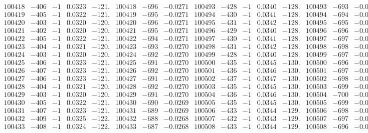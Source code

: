 \documentclass[11pt,reqno,a4letter]{article}
\numberwithin{figure}{section}
\numberwithin{table}{section}
\theoremstyle{plain}
\numberwithin{theorem}{section}
\theoremstyle{definition}
\begin{document}
\begin{table}[ht!]
\begin{equation*}
{\begin{array}{ccccc|ccc||ccccc|ccc}
100418 & -406 & -1 & 0.0323 & -121. & 100418 & -696 & -0.0271 & 100493 & -428 & -1 & 0.0340 & -128. & 100493 & -693 & -0.0270  \\
100419 & -405 & -1 & 0.0322 & -121. & 100419 & -695 & -0.0271 & 100494 & -430 & -1 & 0.0341 & -128. & 100494 & -694 & -0.0271  \\
100420 & -403 & -1 & 0.0320 & -120. & 100420 & -696 & -0.0271 & 100495 & -431 & -1 & 0.0342 & -128. & 100495 & -695 & -0.0271  \\
100421 & -402 & -1 & 0.0320 & -120. & 100421 & -695 & -0.0271 & 100496 & -429 & -1 & 0.0340 & -128. & 100496 & -696 & -0.0271  \\
100422 & -405 & -1 & 0.0322 & -121. & 100422 & -694 & -0.0271 & 100497 & -430 & -1 & 0.0341 & -128. & 100497 & -697 & -0.0272  \\
100423 & -404 & -1 & 0.0321 & -120. & 100423 & -693 & -0.0270 & 100498 & -431 & -1 & 0.0342 & -128. & 100498 & -698 & -0.0272  \\
100424 & -403 & -1 & 0.0320 & -120. & 100424 & -692 & -0.0270 & 100499 & -428 & -1 & 0.0340 & -128. & 100499 & -697 & -0.0272  \\
100425 & -406 & -1 & 0.0323 & -121. & 100425 & -691 & -0.0270 & 100500 & -435 & -1 & 0.0345 & -130. & 100500 & -696 & -0.0271  \\
100426 & -407 & -1 & 0.0323 & -121. & 100426 & -692 & -0.0270 & 100501 & -436 & -1 & 0.0346 & -130. & 100501 & -697 & -0.0272  \\
100427 & -406 & -1 & 0.0323 & -121. & 100427 & -691 & -0.0270 & 100502 & -437 & -1 & 0.0347 & -130. & 100502 & -698 & -0.0272  \\
100428 & -404 & -1 & 0.0321 & -120. & 100428 & -692 & -0.0270 & 100503 & -435 & -1 & 0.0345 & -130. & 100503 & -699 & -0.0273  \\
100429 & -403 & -1 & 0.0320 & -120. & 100429 & -691 & -0.0270 & 100504 & -436 & -1 & 0.0346 & -130. & 100504 & -700 & -0.0273  \\
100430 & -405 & -1 & 0.0322 & -121. & 100430 & -690 & -0.0269 & 100505 & -435 & -1 & 0.0345 & -130. & 100505 & -699 & -0.0273  \\
100431 & -407 & -1 & 0.0323 & -121. & 100431 & -689 & -0.0269 & 100506 & -433 & -1 & 0.0344 & -129. & 100506 & -698 & -0.0272  \\
100432 & -409 & -1 & 0.0325 & -122. & 100432 & -688 & -0.0268 & 100507 & -432 & -1 & 0.0343 & -129. & 100507 & -697 & -0.0272  \\
100433 & -408 & -1 & 0.0324 & -122. & 100433 & -687 & -0.0268 & 100508 & -433 & -1 & 0.0344 & -129. & 100508 & -696 & -0.0271  \\

\end{array}}
\end{equation*}
\end{table}
\end{document}
